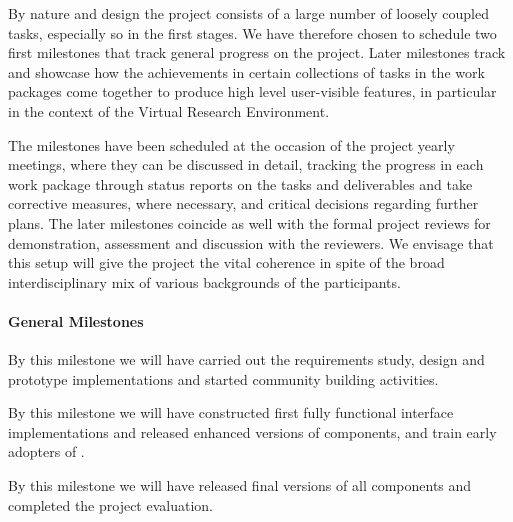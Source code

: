 

By nature and design the project consists of a large number of loosely
coupled tasks, especially so in the first stages. We have therefore
chosen to schedule two first milestones that track general progress on
the project. Later milestones track and showcase how the achievements
in certain collections of tasks in the work packages come together to
produce high level user-visible features, in particular in the context
of the Virtual Research Environment.

The milestones have been scheduled at the occasion of the project
yearly meetings, where they can be discussed in detail, tracking the
progress in each work package through status reports on the tasks and
deliverables and take corrective measures, where necessary, and
critical decisions regarding further plans. The later milestones
coincide as well with the formal project reviews for demonstration,
assessment and discussion with the reviewers.
%
We envisage that this
setup will give the project the vital coherence in spite of the broad
interdisciplinary mix of various backgrounds of the participants.

\paragraph{General Milestones}

\begin{milestones}
  {By this milestone we will have carried out the requirements study, design and prototype implementations and started community building activities.}

  {By this milestone we will have constructed first fully functional interface implementations and released enhanced versions of \TheProject components, and train early adopters of \TheProject.}

  {By this milestone we will have released final versions of all \TheProject components and completed the project evaluation.}
\end{milestones}

